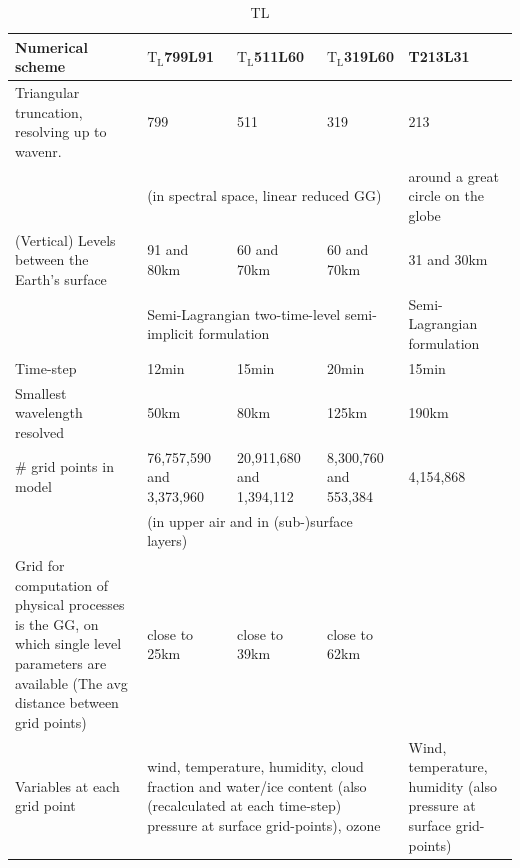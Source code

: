 \begin{table}[h!]
\centering
\renewcommand{\arraystretch}{1.5}
\begin{tabular}{|p{4cm} |p{3cm} |p{3cm}| p{3cm}| p{3cm}}
    \toprule
    Numerical scheme   & $\textrm{T}_\textrm{L}$799L91  & $\textrm{T}_\textrm{L}$511L60 & $\textrm{T}_\textrm{L}$319L60 & T213L31\\
    \midrule
    Triangular truncation, resolving up to wavenr.  & 799  &  511 &  319 & 213\\
                                                       & \multicolumn{3}{|p{0.4\textwidth}|}{(in spectral space, linear reduced GG)} 
                                                       & around a great circle on the globe \\ \hline
    (Vertical) Levels between the Earth's surface & 91 and 80km  & 60 and 70km & 60 and 70km & 31 and 30km\\
                                                  &  \multicolumn{3}{|p{0.5\textwidth}|}{Semi-Lagrangian two-time-level semi-implicit formulation} 
                                                  & Semi-Lagrangian formulation \\ \hline
    Time-step   & 12min & 15min & 20min & 15min \\
    Smallest wavelength resolved  & 50km & 80km & 125km & 190km \\
    \# grid points in model & 76,757,590 and 3,373,960 &
    20,911,680 and 1,394,112 & 8,300,760 and 553,384 & 4,154,868\\
                                                & \multicolumn{3}{|p{0.4\textwidth}|}{(in upper air and in (sub-)surface layers)} 
                                                & \\ \hline
    Grid for computation of physical processes is the GG, on which single level parameters are available (The avg distance between grid points)  & close to 25km
    & close to 39km &  close to 62km & \\
    Variables at each grid point &
      \multicolumn{3}{|p{0.5\textwidth}|}{wind, temperature, humidity, cloud fraction and water/ice content (also (recalculated at each time-step) pressure at surface grid-points), ozone} 
      & Wind, temperature, humidity (also pressure at surface grid-points) \\
    \bottomrule
\end{tabular}
\caption{TL}
\label{tab:spac-coord}
\end{table}  

